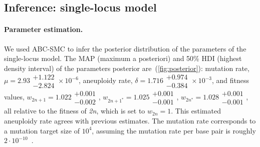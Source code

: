 \documentclass[12pt]{extarticle}
\newcommand{\euwt}{\emph{2n}}
\begin{document}
\subsection*{Inference: single-locus model}


\paragraph{Parameter estimation.} 
We used ABC-SMC to infer the posterior distribution of the parameters of the single-locus model.
The MAP (maximum a posteriori) and 50\% HDI (highest density interval) of the parameters posterior are~(\autoref{fig:posterior}): %
mutation rate, $\mu=2.93\substack{+1.122 \\ -2.824}\times10^{-6}$,
aneuploidy rate, $\delta=1.716\substack{+0.974 \\ -0.384}\times10^{-3}$,
and fitness values, $w_{2n+1}=1.022\substack{+0.001 \\ -0.002}$,
$w_{2n+1^*}=1.025\substack{+0.001 \\ -0.001}$,
$w_{2n^*}=1.028\substack{+0.001 \\ -0.001}$, all relative to the fitness of \euwt, which is set to $w_{2n}=1$.
This estimated aneuploidy rate agrees with previous estimates. %
The mutation rate corresponds to a mutation target size of $10^{4}$, assuming the mutation rate per base pair is roughly $2\cdot10^{-10}$~\citep{Zhu2014}. 
\end{document}

